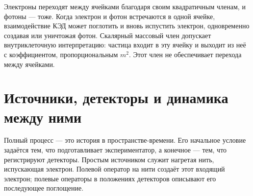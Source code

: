Электроны переходят между ячейками благодаря своим квадратичным членам, и фотоны — тоже. Когда электрон и фотон встречаются в одной ячейке, взаимодействие КЭД может поглотить и вновь испустить электрон, одновременно создавая или уничтожая фотон. Скалярный массовый член допускает внутриклеточную интерпретацию: частица входит в эту ячейку и выходит из неё с коэффициентом, пропорциональным \(m^2\). Этот член не обеспечивает перехода между ячейками.

\begin{classroomqa}
\end{classroomqa}

\begin{classroomqa}
\end{classroomqa}

\section{Источники, детекторы и динамика между ними}

Полный процесс — это история в пространстве-времени. Его начальное условие задаётся тем, что подготавливает экспериментатор, а конечное — тем, что регистрируют детекторы. Простым источником служит нагретая нить, испускающая электрон. Полевой оператор на нити создаёт этот входящий электрон; полевые операторы в положениях детекторов описывают его последующее поглощение.

\begin{classroomqa}
\end{classroomqa}

